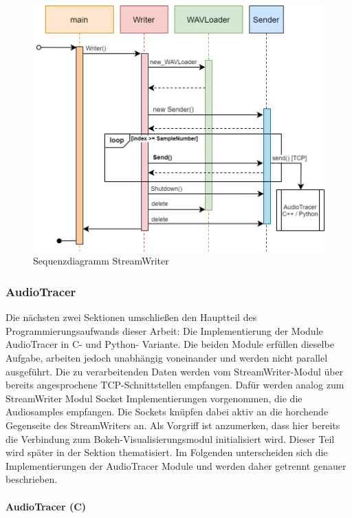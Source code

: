\begin{figure}[hbt!]
	\centering      
	\includegraphics[scale=0.4]{figures/StreamWriter_sequence_diagram.png}
	\caption{Sequenzdiagramm StreamWriter}
	\label{fig:Seq_StreamWriter}
\end{figure}
\clearpage
	
\subsubsection{AudioTracer} \label{sec:audiotracer}

Die nächsten zwei Sektionen umschließen den Hauptteil des Programmierungsaufwands dieser Arbeit: Die Implementierung der Module AudioTracer in C- und Python- Variante. Die beiden Module erfüllen dieselbe Aufgabe, arbeiten jedoch unabhängig voneinander und werden nicht parallel ausgeführt. Die zu verarbeitenden Daten werden vom StreamWriter-Modul über bereits angesprochene TCP-Schnittstellen empfangen. Dafür werden analog zum StreamWriter Modul Socket Implementierungen vorgenommen, die die Audiosamples empfangen. Die Sockets knüpfen dabei aktiv an die horchende Gegenseite des StreamWriters an. Als Vorgriff ist anzumerken, dass hier bereits die Verbindung zum Bokeh-Visualisierungsmodul initialisiert wird. Dieser Teil wird später in der Sektion  thematisiert. Im Folgenden unterscheiden sich die Implementierungen der AudioTracer Module und werden daher getrennt genauer beschrieben.

\paragraph{AudioTracer (C)}

